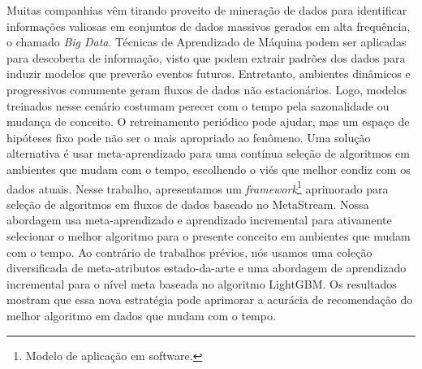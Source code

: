 Muitas companhias vêm tirando proveito de mineração de dados para identificar informações valiosas em conjuntos de dados massivos gerados em alta frequência, o chamado \textit{Big Data}. Técnicas de Aprendizado de Máquina podem ser aplicadas para descoberta de informação, visto que podem extrair padrões dos dados para induzir modelos que preverão eventos futuros. Entretanto, ambientes dinâmicos e progressivos comumente geram fluxos de dados não estacionários. Logo, modelos treinados nesse cenário costumam perecer com o tempo pela sazonalidade ou mudança de conceito. O retreinamento periódico pode ajudar, mas um espaço de hipóteses fixo pode não ser o mais apropriado ao fenômeno. Uma solução alternativa é usar meta-aprendizado para uma contínua seleção de algoritmos em ambientes que mudam com o tempo, escolhendo o viés que melhor condiz com os dados atuais. Nesse trabalho, apresentamos um \textit{framework}\footnote{Modelo de aplicação em software.} aprimorado para seleção de algoritmos em fluxos de dados baseado no MetaStream. Nossa abordagem usa meta-aprendizado e aprendizado incremental para ativamente selecionar o melhor algoritmo para o presente conceito em ambientes que mudam com o tempo. Ao contrário de trabalhos prévios, nós usamos uma coleção diversificada de meta-atributos estado-da-arte e uma abordagem de aprendizado incremental para o nível meta baseada no algoritmo LightGBM. Os resultados mostram que essa nova estratégia pode aprimorar a acurácia de recomendação do melhor algoritmo em dados que mudam com o tempo.